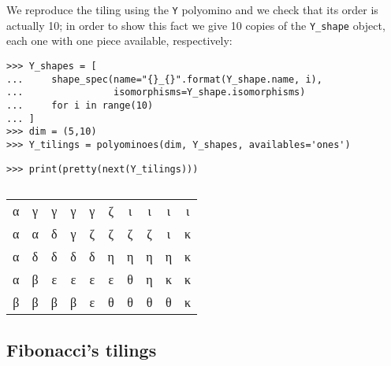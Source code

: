 We reproduce the tiling using the \verb|Y| polyomino and we check that its order is
actually 10; in order to show this fact we give 10 copies of the \verb|Y_shape| object,
each one with one piece available, respectively:
\begin{verbatim}
>>> Y_shapes = [
...     shape_spec(name="{}_{}".format(Y_shape.name, i), 
...                isomorphisms=Y_shape.isomorphisms)
...     for i in range(10)
... ]
>>> dim = (5,10)
>>> Y_tilings = polyominoes(dim, Y_shapes, availables='ones')
\end{verbatim}

\begin{margintable}
\texttt{>>> print(pretty(next(Y_tilings)))}

{
\setlength{\tabcolsep}{4pt}
$\quad$\\
\begin{tabular}{|cccccccccc|}
\hline
α & γ & γ & γ & γ & ζ & ι & ι & ι & ι \\
α & α & δ & γ & ζ & ζ & ζ & ζ & ι & κ \\
α & δ & δ & δ & δ & η & η & η & η & κ \\
α & β & ε & ε & ε & ε & θ & η & κ & κ \\
β & β & β & β & ε & θ & θ & θ & θ & κ \\
\hline
\end{tabular}
}
\end{margintable}

\subsection{Fibonacci's tilings}

\inputminted[fontsize=\small,stripnl=false, firstline=511,lastline=525]{python}{backtracking/polyominoes.py}

